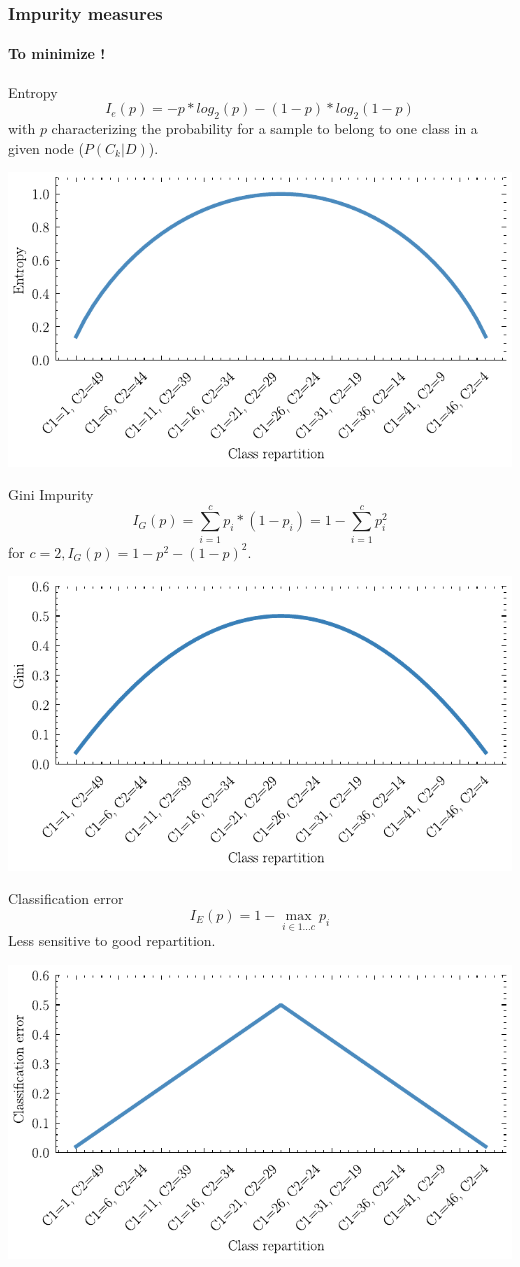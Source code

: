 \documentclass[11pt]{beamer}
\begin{document}
\begin{frame}[allowframebreaks]
  \frametitle{Impurity measures}
  \framesubtitle{To minimize !}
  \begin{block}{Entropy}
    $$
    I_e(p)= - p * log_2(p) - (1-p) * log_2(1-p)
    $$
    with $p$ characterizing the probability for a sample to belong to one class
    in a given node ($P(C_k | D)$).
    \begin{center}
   \includegraphics[width=.6\textwidth]{entropy}
   \end{center}
 \end{block}
    
  \begin{block}{Gini Impurity}
    $$
    I_G(p) = \sum_{i=1}^c p_i * (1-p_i) = 1 - \sum_{i=1}^c p_i^2
    $$
    for $c=2, I_G(p) = 1 - p^2 - (1-p)^2$. 
    \begin{center}
    \includegraphics[width=.6\textwidth]{gini}
  \end{center}
\end{block}

  \begin{block}{Classification error}
    $$I_E(p) = 1 - \max_{i \in 1 \dots c} {p_i}$$
    Less sensitive to good repartition.
    \begin{center}
    \includegraphics[width=.6\textwidth]{ce}
  \end{center}
  \end{block}

\end{frame}
\end{document}
